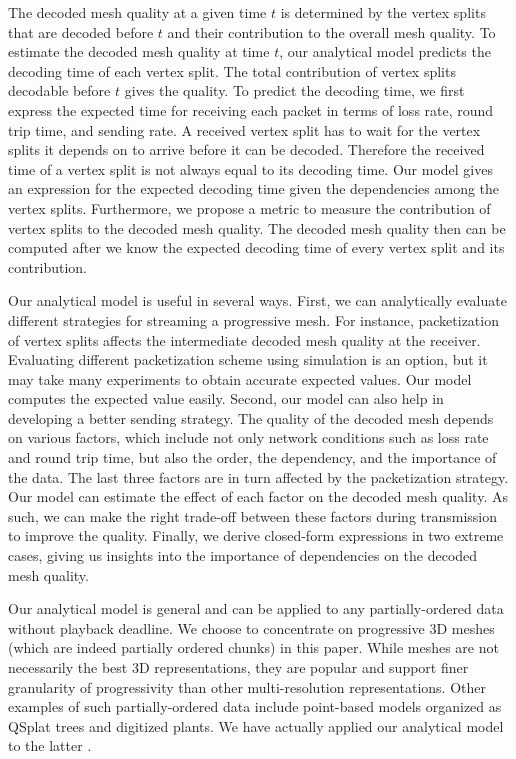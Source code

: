     The decoded mesh quality at a given time $t$ is determined by 
    the vertex splits that are decoded before $t$ and their contribution to the overall mesh quality.
    To estimate the decoded mesh quality at time $t$, our analytical model
    predicts the decoding time of each vertex split.  The total contribution of vertex
    splits decodable before $t$ gives the quality.  To predict the decoding time, we first
    express the expected time for receiving each packet
        in terms of loss rate, round trip time, and sending rate.
    A received vertex split has to wait for the vertex splits
    it depends on to arrive before it can be decoded.
    Therefore the received time of a vertex split is not always equal to its decoding
    time.  Our model gives an expression for the expected
    decoding time given the dependencies among the vertex splits.
    Furthermore, we propose
    a metric to measure the contribution of 
    vertex splits to the
    decoded mesh quality. The decoded mesh quality then can be computed 
    after we know the expected decoding time of every vertex split
    and its contribution.

    Our analytical model is useful in several ways.  First,
    we can analytically evaluate different strategies for streaming
    a progressive mesh.  For instance, packetization of vertex
    splits affects the intermediate decoded mesh quality
    at the receiver.  Evaluating different packetization scheme
    using simulation is an option, but
    it may take many experiments to obtain accurate
    expected values.  Our model computes the expected value easily.
    Second, our model can also help in developing a better sending
    strategy.  The quality of the decoded mesh depends on
    various factors, which include not only network conditions such
    as loss rate and round trip time, but also the order, the
    dependency, and the importance of the data.
    The last three factors are in turn affected by the packetization
    strategy.  Our model can estimate the effect of each factor on the
    decoded mesh quality.
    As such, we can make the right trade-off between these factors
    during transmission to improve the quality.
    Finally, we derive closed-form expressions in two extreme cases,
    giving us insights into the importance of dependencies on the
    decoded mesh quality.

    Our analytical model is general and can be applied to any 
    partially-ordered data without playback deadline.  We
    choose to concentrate on progressive 3D meshes (which are indeed 
    partially ordered chunks) in this paper. 
    While meshes are not necessarily the best 3D representations, they 
    are popular and support finer granularity of progressivity 
    than other multi-resolution representations. 
    Other examples of such partially-ordered data include point-based models 
    organized as QSplat trees \cite{rusinkiewicz:qsplat} and digitized plants.  
    We have actually applied our analytical model to the latter \cite{plant:seb}.
    
